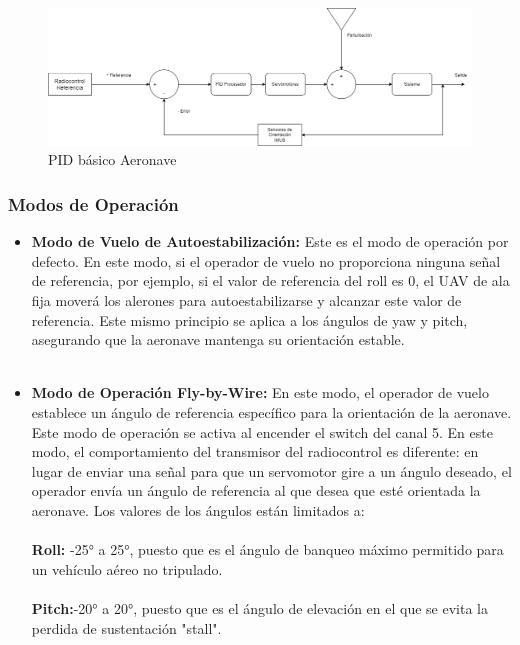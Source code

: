     \begin{figure}[H]
        \centering
        \includegraphics[width=\textwidth]{Imagenes/Firmware/PID basico.png}
        \caption{PID básico Aeronave }
        \label{fig:pid1 }
    \end{figure} 
    \subsubsection{Modos de Operación} 
        \begin{itemize}
            \item \textbf{Modo de Vuelo de Autoestabilización:} Este es el modo de operación por defecto. En este modo, si el operador de vuelo no proporciona ninguna señal de referencia, por ejemplo, si el valor de referencia del roll es 0, el UAV de ala fija moverá los alerones para autoestabilizarse y alcanzar este valor de referencia. Este mismo principio se aplica a los ángulos de yaw y pitch, asegurando que la aeronave mantenga su orientación estable.
            \\ \\
            \item \textbf{Modo de Operación Fly-by-Wire:} En este modo, el operador de vuelo establece un ángulo de referencia específico para la orientación de la aeronave. Este modo de operación se activa al encender el switch del canal 5. En este modo, el comportamiento del transmisor del radiocontrol es diferente: en lugar de enviar una señal para que un servomotor gire a un ángulo deseado, el operador envía un ángulo de referencia al que desea que esté orientada la aeronave. Los valores de los ángulos están limitados a: \\ \\

        \textbf{Roll:} -25° a 25°, puesto que es el ángulo de banqueo máximo permitido para un vehículo aéreo no tripulado. \\ \\
        \textbf{Pitch:}-20° a 20°, puesto que es el ángulo de elevación en el que se evita la perdida de sustentación "stall".
        \end{itemize}
